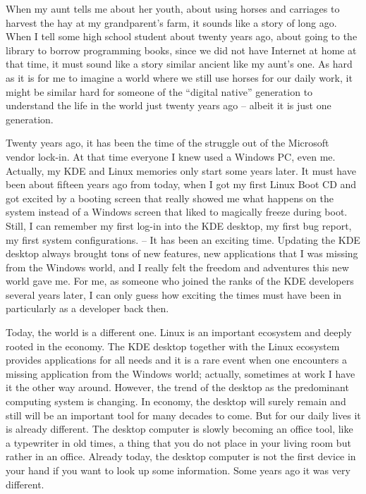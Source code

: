 

\noindent{}When my aunt tells me about her youth, about using horses and carriages to harvest the hay at my grandparent’s farm, it sounds like a story of long ago. When I tell some high school student about twenty years ago, about going to the library to borrow programming books, since we did not have Internet at home at that time, it must sound like a story similar ancient like my aunt’s one. As hard as it is for me to imagine a world where we still use horses for our daily work, it might be similar hard for someone of the ``digital native'' generation to understand the life in the world just twenty years ago – albeit it is just one generation.

Twenty years ago, it has been the time of the struggle out of the Microsoft vendor lock-in. At that time everyone I knew used a Windows PC, even me. Actually, my KDE and Linux memories only start some years later. It must have been about fifteen years ago from today, when I got my first Linux Boot CD and got excited by a booting screen that really showed me what happens on the system instead of a Windows screen that liked to magically freeze during boot. Still, I can remember my first log-in into the KDE desktop, my first bug report, my first system configurations. -- It has been an exciting time. Updating the KDE desktop always brought tons of new features, new applications that I was missing from the Windows world, and I really felt the freedom and adventures this new world gave me. For me, as someone who joined the ranks of the KDE developers several years later, I can only guess how exciting the times must have been in particularly as a developer back then.

Today, the world is a different one. Linux is an important ecosystem and deeply rooted in the economy. The KDE desktop together with the Linux ecosystem provides applications for all needs and it is a rare event when one encounters a missing application from the Windows world; actually, sometimes at work I have it the other way around. However, the trend of the desktop as the predominant computing system is changing. In economy, the desktop will surely remain and still will be an important tool for many decades to come. But for our daily lives it is already different. The desktop computer is slowly becoming an office tool, like a typewriter in old times, a thing that you do not place in your living room but rather in an office. Already today, the desktop computer is not the first device in your hand if you want to look up some information. Some years ago it was very different.

